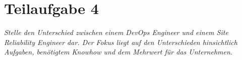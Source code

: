 \section{Teilaufgabe 4}

\textit{Stelle den Unterschied zwischen einem DevOps Engineer und einem Site Reliability Engineer dar. Der Fokus liegt auf den Unterschieden hinsichtlich Aufgaben, benötigtem Knowhow und dem Mehrwert für das Unternehmen.}